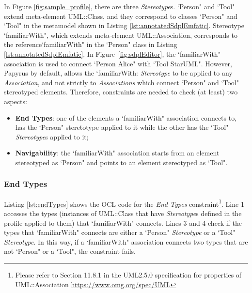 In Figure \ref{fig:sample_profile}, there are three \textit{Stereotype}s. `Person" and `Tool" extend meta-element UML::Class, and they correspond to classes `Person" and `Tool" in the metamodel shown in Listing \ref{lst:annotatedSdplEmfatic}. 
Stereotype `familiarWith", which extends meta-element UML::Association, corresponds to the reference`familiarWith" in the `Person" class in Listing \ref{lst:annotatedSdplEmfatic}.
In Figure~\ref{fig:sdplEditor}, the `familiarWith" association is used to connect `Person Alice" with `Tool StarUML". 
However, Papyrus by default, allows the `familiarWith: \textit{Stereotype} to be applied to any \emph{Association}, and not strictly to \emph{Associations} which connect `Person" and `Tool" stereotyped elements. 
Therefore, constraints are needed to check (at least) two aspects:

\begin{itemize}
	\item \textbf{End Types}: one of the elements a `familiarWith" association connects to, has the `Person" steretotype applied to it while the other has the `Tool" \textit{Stereotype}s applied to it;
	\item \textbf{Navigability}: the `familiarWith" association starts from an element stereotyped as `Person" and points to an element stereotyped as `Tool".
\end{itemize}

\subsubsection{End Types}
Listing \ref{lst:endTypes} shows the OCL code for the \emph{End Types} constraint\footnote{Please refer to Section 11.8.1 in the UML2.5.0 specification for properties of UML::Association \url{https://www.omg.org/spec/UML}}. 
Line 1 accesses the types (instances of UML::Class that have \textit{Stereotype}s defined in the profile applied to them) that `familiarWith" connects. 
Lines 3 and 4 check if the types that `familiarWith" connects are either a `Person" \textit{Stereotype} or a `Tool" \textit{Stereotype}. 
In this way, if a `familiarWith" association connects two types that are not `Person" or a `Tool", the constraint fails.



